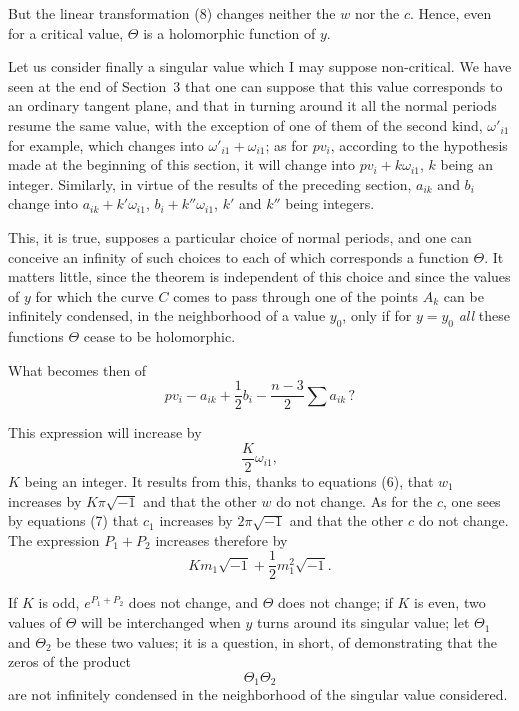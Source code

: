 \documentclass{article}
\begin{document}
But the linear transformation (8) changes neither the $w$ nor the $c$. Hence, even for a critical value, $\Theta$ is a holomorphic function of $y$.

Let us consider finally a singular value which I may suppose non-critical. We have seen at the end of Section~3 that one can suppose that this value corresponds to an ordinary tangent plane, and that in turning around it all the normal periods resume the same value, with the exception of one of them of the second kind, $\omega'_{i1}$ for example, which changes into $\omega'_{i1} + \omega_{i1}$; as for $p v_{i}$, according to the hypothesis made at the beginning of this section, it will change into $p v_{i} + k \omega_{i1}$, $k$ being an integer. Similarly, in virtue of the results of the preceding section, $a_{ik}$ and $b_{i}$ change into $a_{ik} + k' \omega_{i1}$, $b_{i} + k'' \omega_{i1}$, $k'$ and $k''$ being integers.

This, it is true, supposes a particular choice of normal periods, and one can conceive an infinity of such choices to each of which corresponds a function $\Theta$. It matters little, since the theorem is independent of this choice and since the values of $y$ for which the curve $C$ comes to pass through one of the points $A_{k}$ can be infinitely condensed, in the neighborhood of a value $y_{0}$, only if for $y = y_{0}$ \emph{all} these functions $\Theta$ cease to be holomorphic.

What becomes then of
\[
p v_{i} - a_{ik} + \frac{1}{2} b_{i} - \frac{n - 3}{2} \sum a_{ik} \, ?
\]

This expression will increase by
\[
\frac{K}{2} \omega_{i1},
\]
$K$ being an integer. It results from this, thanks to equations (6), that $w_{1}$ increases
by $K \pi \sqrt{-1}$ and that the other $w$ do not change. As for the $c$, one sees by equations (7) that $c_{1}$ increases by $2 \pi \sqrt{-1}$ and that the other $c$ do not change. The expression $P_{1} + P_{2}$ increases therefore by
\[
K m_{1} \sqrt{-1} + \frac{1}{2} m_{1}^{2} \sqrt{-1}.
\]

If $K$ is odd, $e^{P_{1} + P_{2}}$ does not change, and $\Theta$ does not change; if $K$ is even, two values of $\Theta$ will be interchanged when $y$ turns around its singular value; let $\Theta_{1}$ and $\Theta_{2}$ be these two values; it is a question, in short, of demonstrating that the zeros of the product
\[
\Theta_{1} \Theta_{2}
\]
are not infinitely condensed in the neighborhood of the singular value considered.
\end{document}
